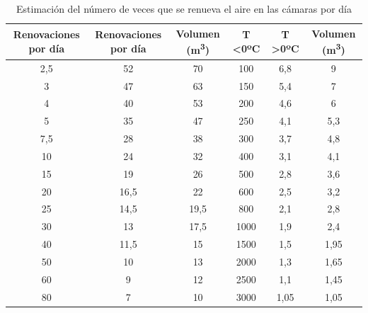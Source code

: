  
 \begin{table}[H]
 	\centering
 	\caption{Estimación del número de veces que se renueva el aire en las cámaras por día}\cite{Martin}
 	\begin{tabular}{cccccc}
 		\toprule
 		Renovaciones por día & Renovaciones por día & Volumen (m\textsuperscript{3}) & T <0ºC & T >0ºC & Volumen (m\textsuperscript{3}) \\
 		\midrule
 		2,5 & 52 & 70 & 100 & 6,8 & 9 \\
 		3 & 47 & 63 & 150 & 5,4 & 7 \\
 		4 & 40 & 53 & 200 & 4,6 & 6 \\
 		5 & 35 & 47 & 250 & 4,1 & 5,3 \\
 		7,5 & 28 & 38 & 300 & 3,7 & 4,8 \\
 		10 & 24 & 32 & 400 & 3,1 & 4,1 \\
 		15 & 19 & 26 & 500 & 2,8 & 3,6 \\
 		20 & 16,5 & 22 & 600 & 2,5 & 3,2 \\
 		25 & 14,5 & 19,5 & 800 & 2,1 & 2,8 \\
 		30 & 13 & 17,5 & 1000 & 1,9 & 2,4 \\
 		40 & 11,5 & 15 & 1500 & 1,5 & 1,95 \\
 		50 & 10 & 13 & 2000 & 1,3 & 1,65 \\
 		60 & 9 & 12 & 2500 & 1,1 & 1,45 \\
 		80 & 7 & 10 & 3000 & 1,05 & 1,05 \\
 		\bottomrule
 	\end{tabular} \label{tabla:renov-air}
 \end{table}

